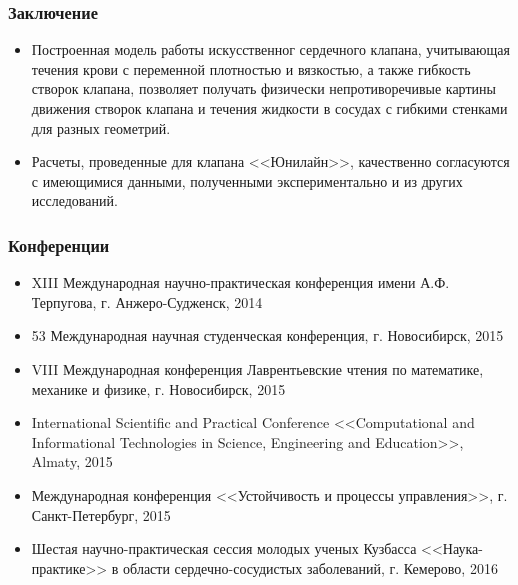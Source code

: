 \documentclass[14pt]{beamer}
\begin{document}
\begin{frame}
\frametitle{Заключение}
    \begin{itemize}
        \item[\MVRightarrow] Построенная модель работы искусственног сердечного
            клапана, учитывающая течения крови с переменной плотностью и
            вязкостью, а также гибкость створок клапана, позволяет получать физически непротиворечивые картины движения створок клапана и течения жидкости в сосудах с гибкими стенками для разных геометрий.
        \item[\MVRightarrow] Расчеты, проведенные для клапана <<Юнилайн>>,
            качественно согласуются с имеющимися данными, полученными
            экспериментально и из других исследований.
    \end{itemize}
\end{frame}

\begin{frame}
\frametitle{Конференции}
    {\tiny
        \begin{itemize}
            \item[\MVRightarrow] XIII Международная научно-практическая конференция имени А.Ф. Терпугова, г. Анжеро-Судженск, 2014
            \item[\MVRightarrow] 53 Международная научная студенческая конференция, г. Новосибирск, 2015 
            \item[\MVRightarrow] VIII Международная конференция Лаврентьевские чтения по математике, механике и физике, г. Новосибирск, 2015
            \item[\MVRightarrow] International Scientific and Practical Conference <<Computational and Informational Technologies in Science, Engineering and Education>>, Almaty, 2015
            \item[\MVRightarrow] Международная конференция <<Устойчивость и процессы управления>>, г. Санкт-Петербург, 2015
            \item[\MVRightarrow] Шестая научно-практическая сессия молодых ученых Кузбасса <<Наука-практике>> в области сердечно-сосудистых заболеваний, г. Кемерово, 2016
        \end{itemize}
    }
\end{frame}
\end{document}
